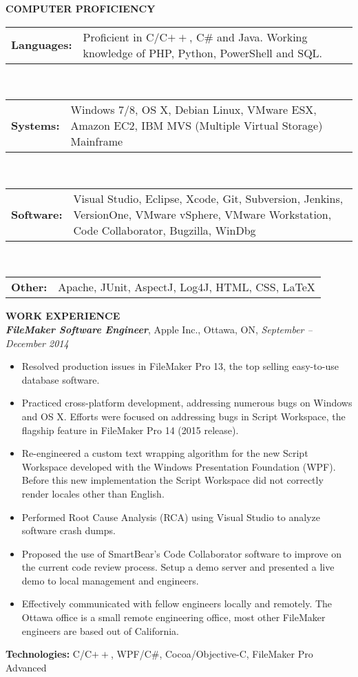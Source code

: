\documentclass[10pt,letterpaper]{article}
\newcommand{\proficiency}[2]
{
\begin{tabular}{p{0.1\columnwidth} p{0.80\columnwidth}}
    \textbf{#1} & #2
\end{tabular}
}
\newcommand{\job}[4]
{
    \emph{\textbf{#1}}, #2, #3, \emph{#4}
}
\begin{document}
\textbf{COMPUTER PROFICIENCY} \hrulefill \\
\begin{adjustwidth}{0.1in}{0.5in}
    \proficiency{Languages:}{ Proficient in C/C$++$, C\# and Java. Working knowledge of PHP, Python, PowerShell and SQL. }\\
    \proficiency{Systems:}{ Windows 7/8, OS X, Debian Linux, VMware ESX, Amazon EC2,
			      IBM MVS (Multiple Virtual Storage) Mainframe }\\
    \proficiency{Software:}{ Visual Studio, Eclipse, Xcode, Git, Subversion, Jenkins, VersionOne, 
			      VMware vSphere, VMware Workstation, Code Collaborator, Bugzilla, WinDbg }\\
    \proficiency{Other:}{ Apache, JUnit, AspectJ, Log4J, HTML, CSS, \LaTeX }
\end{adjustwidth}
\vspace{0.5em}
\textbf{WORK EXPERIENCE} \hrulefill \\[0.5em]
\job{FileMaker Software Engineer}{Apple Inc.}{Ottawa, ON}{September -- December  2014}\\
\begin{adjustwidth}{0.1in}{0.5in}
    \begin{itemize}
    \item Resolved production issues in FileMaker Pro 13, the top selling easy-to-use database software. 
    \item Practiced cross-platform development, addressing numerous bugs on Windows and OS X. Efforts were focused on addressing bugs in Script Workspace, the flagship feature in FileMaker Pro 14 (2015 release).
    \item Re-engineered a custom text wrapping algorithm for the new Script Workspace developed with the Windows Presentation Foundation (WPF). Before this new implementation the Script Workspace did not correctly render locales other than English.
    \item Performed Root Cause Analysis (RCA) using Visual Studio to analyze software crash dumps.  
    \item Proposed the use of SmartBear's Code Collaborator software to improve on the current code review process. Setup a demo server and presented a live demo to local management and engineers. 
    \item Effectively communicated with fellow engineers locally and remotely. The Ottawa office is a small remote engineering office, most other FileMaker engineers are based out of California.
    \end{itemize}
    \vspace{0.5em}
    \textbf{Technologies:} C/C$++$, WPF/C\#, Cocoa/Objective-C, FileMaker Pro Advanced
\end{adjustwidth}
\end{document}
